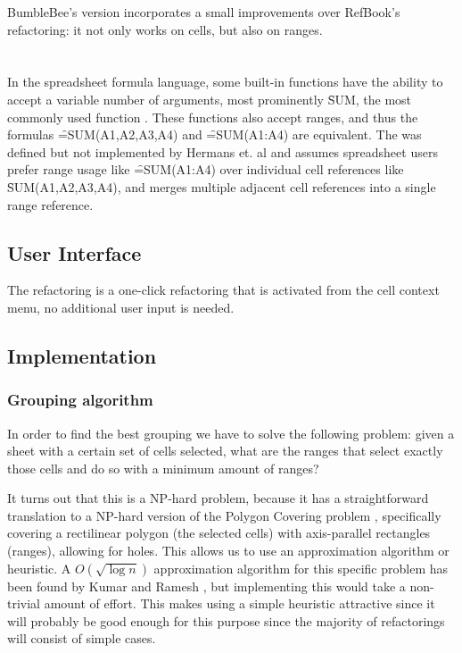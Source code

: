 BumbleBee's version incorporates a small improvements over RefBook's refactoring: it not only works on cells, but also on ranges.

\section{}
\label{refac:groupreferences}

In the spreadsheet formula language, some built-in functions have the ability to accept a variable number of arguments, most prominently \f{SUM}, the most commonly used function \cite{hermans2015enron}.
These functions also accept ranges, and thus the formulas \f{=SUM(A1,A2,A3,A4)} and \f{=SUM(A1:A4)} are equivalent.
The  was defined but not implemented by Hermans et. al \cite{hermans2014detecting} and assumes spreadsheet users prefer range usage like \f{=SUM(A1:A4)} over individual cell references like \f{SUM(A1,A2,A3,A4)}, and merges multiple adjacent cell references into a single range reference.

\subsection{User Interface}

The refactoring is a one-click refactoring that is activated from the cell context menu, no additional user input is needed.

\subsection{Implementation}

\subsubsection{Grouping algorithm}

In order to find the best grouping we have to solve the following problem: given a sheet with a certain set of cells selected, what are the ranges that select exactly those cells and do so with a minimum amount of ranges?

It turns out that this is a NP-hard problem, because it has a straightforward translation to a NP-hard version of the Polygon Covering problem \cite{masek1979some}, specifically covering a rectilinear polygon (the selected cells) with axis-parallel rectangles (ranges), allowing for holes.
This allows us to use an approximation algorithm or heuristic.
A $O(\sqrt{\log{n}})$ approximation algorithm for this specific problem has been found by Kumar and Ramesh \cite{kumar2003covering}, but implementing this would take a non-trivial amount of effort.
This makes using a simple heuristic attractive since it will probably be good enough for this purpose since the majority of refactorings will consist of simple cases.

